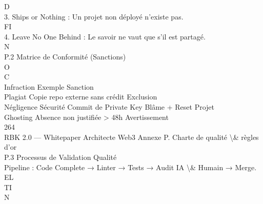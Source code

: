 \vspace{0.5em}
\vspace{0.5em}
\vspace{0.5em}
\vspace{0.5em}
D\\
3. Ships or Nothing : Un projet non déployé n’existe pas.\\
\vspace{0.5em}
\vspace{0.5em}
\vspace{0.5em}
FI\\
4. Leave No One Behind : Le savoir ne vaut que s’il est partagé.\\
N\\
P.2 Matrice de Conformité (Sanctions)\\
O\\
C\\
\vspace{0.5em}
\vspace{0.5em}
Infraction          Exemple                        Sanction\\
Plagiat             Copie repo externe sans crédit Exclusion\\
Négligence Sécurité Commit de Private Key          Blâme + Reset Projet\\
Ghosting            Absence non justifiée \textgreater{} 48h Avertissement\\
\vspace{0.5em}
\vspace{0.5em}
\vspace{0.5em}
\vspace{0.5em}
264\\
RBK 2.0 — Whitepaper Architecte Web3                                               Annexe P. Charte de qualité \textbackslash{}& règles d’or\\
\vspace{0.5em}
\vspace{0.5em}
\vspace{0.5em}
P.3 Processus de Validation Qualité\\
Pipeline : Code Complete → Linter → Tests → Audit IA \textbackslash{}& Humain → Merge.\\
\vspace{0.5em}
\vspace{0.5em}
\vspace{0.5em}
\vspace{0.5em}
EL\\
TI\\
N\\
